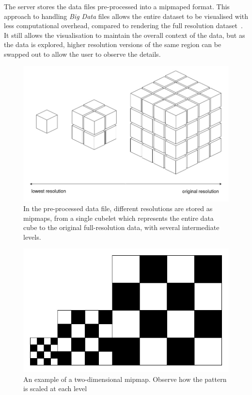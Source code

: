 The server stores the data files pre-processed into a mipmaped format.
This approach to handling \textit{Big Data} files allows the entire dataset to be visualised with less computational overhead, compared to rendering the full resolution dataset~\cite{Li2016}. 
It still allows the visualisation to maintain the overall context of the data, but as the data is explored, higher resolution versions of the same region can be swapped out to allow the user to observe the details.

\begin{figure}
    \centering
    \includegraphics[width=0.6\linewidth]{figures/three-dimensional-mipmap.jpg}
    \caption{In the pre-processed data file, different resolutions are stored as mipmaps, from a single cubelet which represents the entire data cube to the original full-resolution data, with several intermediate levels.}
    \label{fig:three-dimensional-mipmap}
\end{figure}

\begin{figure}
    \centering
    \includegraphics[width=0.5\linewidth]{figures/two-dimensional-mipmap.jpg}
    \caption{An example of a two-dimensional mipmap. Observe how the pattern is scaled at each level}
    \label{fig:two-dimensional-mipmap}
\end{figure}


